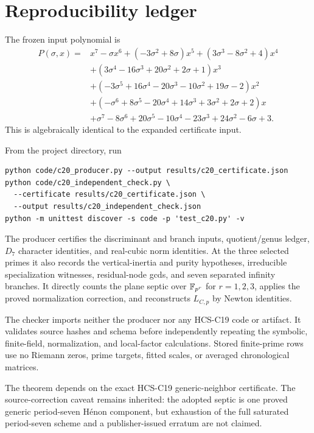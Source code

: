 \section{Reproducibility ledger}\label{app:reproduce}

The frozen input polynomial is
\begin{align*}
P(\sigma,x)={}&x^7-\sigma x^6+(-3\sigma^2+8\sigma)x^5
 +(3\sigma^3-8\sigma^2+4)x^4\\
&+(3\sigma^4-16\sigma^3+20\sigma^2+2\sigma+1)x^3\\
&+(-3\sigma^5+16\sigma^4-20\sigma^3-10\sigma^2+19\sigma-2)x^2\\
&+(-\sigma^6+8\sigma^5-20\sigma^4+14\sigma^3+3\sigma^2+2\sigma+2)x\\
&+\sigma^7-8\sigma^6+20\sigma^5-10\sigma^4-23\sigma^3
 +24\sigma^2-6\sigma+3.
\end{align*}
This is algebraically identical to the expanded certificate input.

From the project directory, run
\begin{verbatim}
python code/c20_producer.py --output results/c20_certificate.json
python code/c20_independent_check.py \
  --certificate results/c20_certificate.json \
  --output results/c20_independent_check.json
python -m unittest discover -s code -p 'test_c20.py' -v
\end{verbatim}

The producer certifies the discriminant and branch inputs, quotient/genus
ledger, $D_7$ character identities, and real-cubic norm identities.  At the
three selected primes it also records the vertical-inertia and purity
hypotheses, irreducible specialization witnesses, residual-node gcds, and
seven separated infinity branches.  It directly counts the plane septic over
$\mathbb F_{p^r}$ for $r=1,2,3$, applies the proved normalization correction, and
reconstructs $L_{C,p}$ by Newton identities.

The checker imports neither the producer nor any HCS-C19 code or artifact.
It validates source hashes and schema before independently repeating the
symbolic, finite-field, normalization, and local-factor calculations.  Stored
finite-prime rows use no Riemann zeros, prime targets, fitted scales, or
averaged chronological matrices.

The theorem depends on the exact HCS-C19 generic-neighbor certificate.  The
source-correction caveat remains inherited: the adopted septic is one proved
generic period-seven H\'enon component, but exhaustion of the full saturated
period-seven scheme and a publisher-issued erratum are not claimed.
